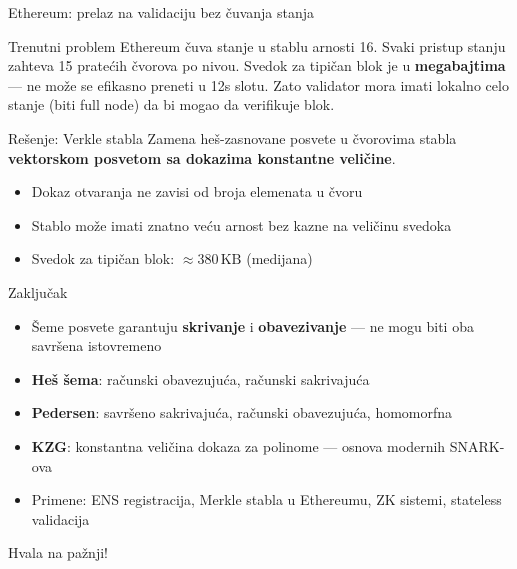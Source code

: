 \documentclass[aspectratio=1610]{beamer}
\newcommand{\keyword}[1]{\textcolor{wcprimary}{\textbf{#1}}}
\begin{document}
\begin{frame}{Ethereum: prelaz na validaciju bez čuvanja stanja}

\begin{alertblock}{Trenutni problem}
  Ethereum čuva stanje u stablu arnosti 16.
  Svaki pristup stanju zahteva 15 pratećih čvorova po nivou.
  Svedok za tipičan blok je u \keyword{megabajtima} — ne može se efikasno preneti u 12s slotu.
  Zato validator mora imati lokalno celo stanje (biti full node) da bi mogao da verifikuje blok.
\end{alertblock}


\begin{block}{Rešenje: Verkle stabla}
  Zamena heš-zasnovane posvete u čvorovima stabla
  \keyword{vektorskom posvetom sa dokazima konstantne veličine}.
  \begin{itemize}
    
    \item Dokaz otvaranja ne zavisi od broja elemenata u čvoru
    \item Stablo može imati znatno veću arnost bez kazne na veličinu svedoka
    \item Svedok za tipičan blok: $\approx 380\,\text{KB}$ (medijana)
  \end{itemize}
\end{block}
\end{frame}


\begin{frame}{Zaključak}

\begin{itemize}
  
  \item Šeme posvete garantuju \keyword{skrivanje} i \keyword{obavezivanje} —
    ne mogu biti oba savršena istovremeno
  \item \keyword{Heš šema}: računski obavezujuća, računski sakrivajuća
  \item \keyword{Pedersen}: savršeno sakrivajuća, računski obavezujuća, homomorfna
  \item \keyword{KZG}: konstantna veličina dokaza za polinome — osnova modernih SNARK-ova
  \item Primene: ENS registracija, Merkle stabla u Ethereumu, ZK sistemi, stateless validacija
\end{itemize}
\end{frame}

\begin{frame}{}
\begin{center}
  \Huge Hvala na pažnji!
\end{center}
\end{frame}
\end{document}
